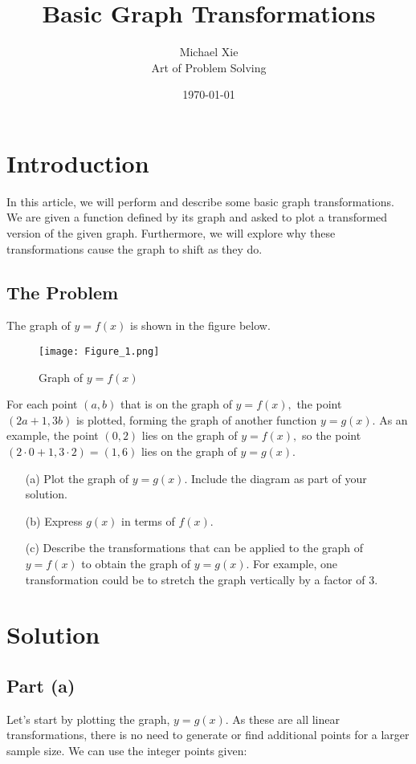 \documentclass{article}
\title{ \vspace{-2.0cm} Basic Graph Transformations}
\author{Michael Xie \\ Art of Problem Solving}
\date{\today}
\begin{document}
\maketitle

\section{Introduction}
In this article, we will perform and describe some basic graph transformations. We are given a function defined by its graph and asked to plot a transformed version of the given graph. Furthermore, we will explore why these transformations cause the graph to shift as they do.

\subsection{The Problem}

The graph of $y = f(x)$ is shown in the figure below.

\begin{figure}[H]
    \texttt{[image: Figure\_1.png]}
    \caption{Graph of $y = f(x)$}
    \label{fig:Figure_1}
\end{figure}

For each point $(a,b)$ that is on the graph of $y = f(x),$ the point $(2a +1, 3b)$ is plotted, forming the graph of another function $y = g(x).$ As an example, the point $(0,2)$ lies on the graph of $y = f(x),$ so the point $(2 \cdot 0 + 1, 3 \cdot 2) = (1, 6)$ lies on the graph of $y = g(x).$

\begin{itemize}
    \item[(a)] Plot the graph of $y = g(x).$ Include the diagram as part of your solution.
    \item[(b)] Express $g(x)$ in terms of $f(x).$ 
    \item[(c)] Describe the transformations that can be applied to the graph of $y = f(x)$ to obtain the graph of $y = g(x).$ For example, one transformation could be to stretch the graph vertically by a factor of 3. 
\end{itemize}

\section{Solution}

\subsection{Part (a)}
Let's start by plotting the graph, $y = g(x)$. As these are all linear transformations, there is no need to generate or find additional points for a larger sample size. We can use the integer points given:
\end{document}
